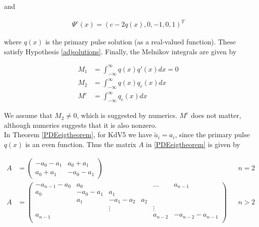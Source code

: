 \documentclass[12pt]{article}
\begin{document}
and

\begin{align}\label{KdV5psic}
\Psi^c(x) = (c - 2 q(x), 0, -1, 0, 1)^T
\end{align}

where $q(x)$ is the primary pulse solution (as a real-valued function). These satisfy Hypothesis \ref{adjsolutions}. Finally, the Melnikov integrals are given by

\begin{align*}
M_1 &= \int_{-\infty}^\infty q(x) q'(x) dx = 0 \\
M_2 &= \int_{-\infty}^\infty q(x) q_c(x) dx \\
M^c &= \int_{-\infty}^\infty q_c(x) dx
\end{align*}

We assume that $M_2 \neq 0$, which is suggested by numerics. $M^c$ does not matter, although numerics suggests that it is also nonzero.\\

In Theorem \ref{PDEeigtheorem}, for KdV5 we have $\tilde{a}_i = a_i$, since the primary pulse $q(x)$ is an even function. Thus the matrix $A$ in \ref{PDEeigtheorem} is given by

\begin{align*}
A &= \begin{pmatrix}
-a_0 -a_1 & a_0 + a_1 \\
a_0 + a_1 & -a_0 - a_1
\end{pmatrix} && n = 2 \\
A &= \begin{pmatrix}
-a_{n-1} - a_0 & a_0 & & & \dots & a_{n-1}\\
a_0 & -a_0 - a_1 &  a_1 \\
& a_1 & -a_1 - a_2 &  a_2 \\
& & \vdots & & \vdots \\
a_{n-1} & & & & a_{n-2} & -a_{n-2} - a_{n-1} \\
\end{pmatrix} && n > 2
\end{align*}
\end{document}
